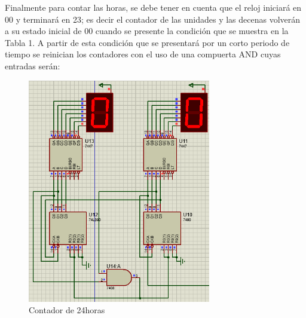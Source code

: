 Finalmente para contar las horas, se debe tener en cuenta que el reloj iniciará en 00 y terminará en 23; es decir el contador de las unidades y las decenas volverán a su estado inicial de 00 cuando se presente la condición que se muestra en la Tabla 1. A partir de esta condición que se presentará por un corto periodo de tiempo se reinician los contadores con el uso de una compuerta AND cuyas entradas serán:

\begin{figure}[h]
    \begin{center}
    \includegraphics[width=8cm]{images/image8.png}
    \newline
    \caption{Contador de 24horas}\label{cont_24}
    \end{center}
\end{figure}
